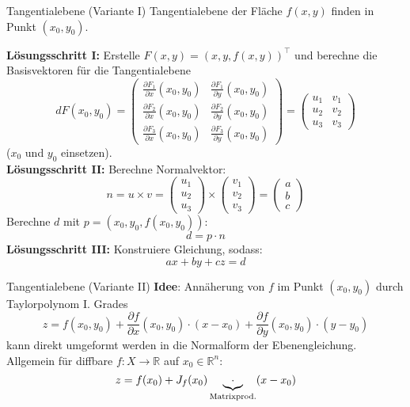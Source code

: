 \begin{Rezept}{Tangentialebene (Variante I)}{}
    Tangentialebene der Fläche $f(x, y)$ finden in Punkt $(x_0, y_0)$.
    
    \textbf{Lösungsschritt I:}
    Erstelle $F(x, y) = (x, y, f(x, y))^\top$ und berechne die
    Basisvektoren für die Tangentialebene
    \[
        dF(x_0, y_0) =
            \begin{pmatrix}
                \frac{\partial F_1}{\partial x}(x_0, y_0)&\frac{\partial F_1}{\partial y}(x_0, y_0)\\
                \frac{\partial F_2}{\partial x}(x_0, y_0)&\frac{\partial F_2}{\partial y}(x_0, y_0)\\
                \frac{\partial F_3}{\partial x}(x_0, y_0)&\frac{\partial F_3}{\partial y}(x_0, y_0)
            \end{pmatrix} = 
            \begin{pmatrix}
                u_1&v_1\\
                u_2&v_2\\
                u_3&v_3
            \end{pmatrix}
    \]
    ($x_0$ und $y_0$ einsetzen).\\
    \textbf{Lösungsschritt II:}
    Berechne Normalvektor:
    \[
        n =
        u \times v =
        \begin{pmatrix}
            u_1\\
            u_2\\
            u_3
        \end{pmatrix}
        \times
        \begin{pmatrix}
            v_1\\
            v_2\\
            v_3
        \end{pmatrix} = 
        \begin{pmatrix}
            a\\
            b\\
            c
        \end{pmatrix}
    \]
    Berechne $d$ mit $p=(x_0,y_0,f(x_0,y_0))$:
    \[
        d=p \cdot n
    \]
    \textbf{Lösungsschritt III:} Konstruiere Gleichung, sodass:
    \[
        ax + by + cz = d
    \]
\end{Rezept}

\begin{Rezept}{Tangentialebene (Variante II)}{}
\textbf{Idee}: Annäherung von $f$ im Punkt $(x_0, y_0)$ durch Taylorpolynom I. Grades
\[ z = f(x_0, y_0) + \frac{\partial f}{\partial x}(x_0, y_0)\cdot(x-x_0) + \frac{\partial f}{\partial y}(x_0, y_0)\cdot(y-y_0) \]
kann direkt umgeformt werden in die Normalform der Ebenengleichung.
Allgemein für diffbare $f: X \rightarrow \mathbb{R}$ auf $x_0 \in \mathbb{R}^n$:
\begin{equation*}
    z = f(x_0) + J_f(x_0) \underbrace{\cdot}_{\small{\text{Matrixprod.}}} (x-x_0)
\end{equation*}
\end{Rezept}
